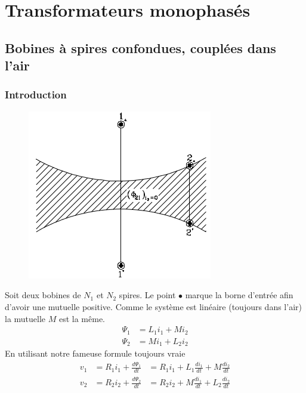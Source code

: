 \newpage
\section{Transformateurs monophasés}
	\subsection{Bobines à spires confondues, couplées dans l'air}
		\subsubsection{Introduction}
				\begin{figure}
		\vspace{-27mm}
		\includegraphics[scale=0.37]{ch3/image8.png}
		\end{figure}
		Soit deux bobines de $N_1$ et $N_2$ spires. Le point $\bullet$ marque 
		la borne d'entrée afin d'avoir une mutuelle positive. Comme le 
		système est linéaire (toujours dans l'air) la mutuelle $M$ est la même.
		\begin{equation}
		\begin{array}{ll}
		\Psi_1 &= L_1i_1 + Mi_2\\
		\Psi_2 &= Mi_1 + L_2i_2
		\end{array}
		\end{equation}
		En utilisant notre fameuse formule toujours vraie
		\begin{equation}
		\begin{array}{lll}
		v_1 &= R_1i_1 + \frac{d\Psi_1}{dt} &= R_1i_1 + L_1\frac{di_1}{dt}+M\frac{
		di_2}{dt}\\
		v_2 &= R_2i_2 + \frac{d\Psi_2}{dt} &= R_2i_2 + M\frac{di_1}{dt}+L_2\frac{
		di_2}{dt}
		\end{array}
		\end{equation}
